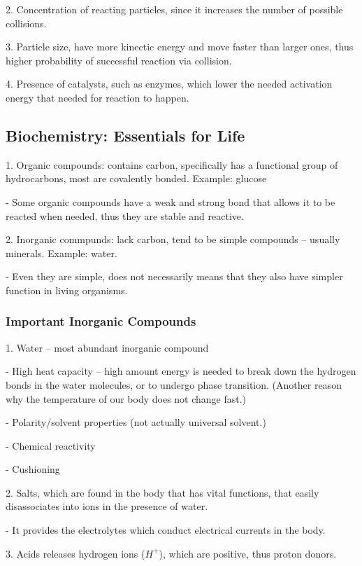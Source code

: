 \documentclass[12pt, UTF8]{article}
\begin{document}
	2. Concentration of reacting particles, since it increases the number of possible collisions.
	
	3. Particle size, have more kinectic energy and move faster than larger ones, thus higher probability of successful reaction via collision.
	
	4. Presence of catalysts, such as enzymes, which lower the needed activation energy that needed for reaction to happen.
	
	\subsection*{Biochemistry: Essentials for Life}
	
	1. Organic compounds: contains carbon, specifically has a functional group of hydrocarbons, most are covalently bonded. Example: glucose
	
	- Some organic compounds have a weak and strong bond that allows it to be reacted when needed, thus they are stable and reactive.
	
	2. Inorganic commpunds: lack carbon, tend to be simple compounds -- usually minerals. Example: water.
	
	- Even they are simple, does not necessarily means that they also have simpler function in living organisms.
	
	\subsubsection*{Important Inorganic Compounds}
	
	1. Water -- most abundant inorganic compound
	
	- High heat capacity -- high amount energy is needed to break down the hydrogen bonds in the water molecules, or to undergo phase transition. (Another reason why the temperature of our body does not change fast.)
	
	- Polarity/solvent properties (not actually universal solvent.)
	
	- Chemical reactivity
	
	- Cushioning
	
	2. Salts, which are found in the body that has vital functions, that easily disassociates into ions in the presence of water.
	
	- It provides the electrolytes which conduct electrical currents in the body.
	
	3. Acids releases hydrogen ions ($H^{+}$), which are positive, thus proton donors.
	
\end{document}
